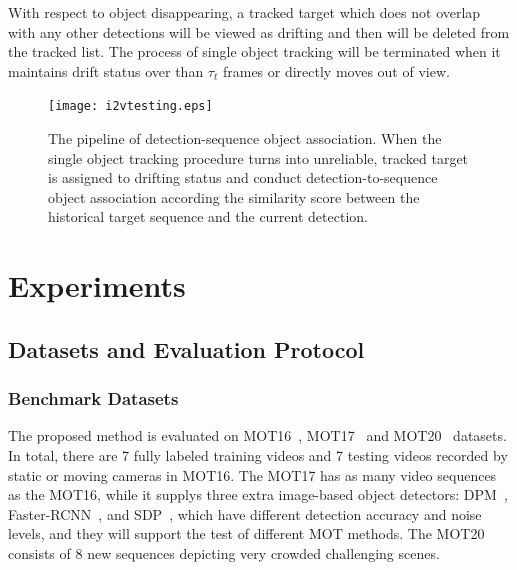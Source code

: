\documentclass[times,twocolumn,final,authoryear]{elsarticle}
\begin{document}
With respect to object disappearing, a tracked target which does not overlap with any other detections will be viewed as drifting and then will be deleted from the tracked list.
The process of single object tracking will be terminated when it maintains drift status over than $ \tau _t$ frames or directly moves out of view. 


\begin{figure}[!ht]
	\centering
	\texttt{[image: i2vtesting.eps]}
	\caption{The pipeline of detection-sequence object association. 
		When the single object tracking procedure turns into unreliable, tracked target is assigned to drifting status and conduct detection-to-sequence object association according the similarity score between the historical target sequence and the current detection.}
	\label{fig:association}
\end{figure}



\section{Experiments}
\subsection{Datasets and Evaluation Protocol}
\subsubsection{Benchmark Datasets}
The proposed method is evaluated on MOT16~\citep{RN583}, MOT17{~\citep{RN583} and MOT20~\citep{2019CVPR19}} datasets.
In total, there are 7 fully labeled training videos and 7 testing videos recorded by static or moving cameras in MOT16. 
The MOT17 has as many video sequences as the MOT16, while it supplys three extra image-based object detectors: DPM~\citep{RN584}, Faster-RCNN~\citep{ren2017faster}, and SDP~\citep{yang2016exploit}, which have different detection accuracy and noise levels, and they will support the test of different MOT methods.
The MOT20 consists of 8 new sequences depicting very crowded challenging scenes. 

\vspace{5pt}
\noindent
\end{document}
